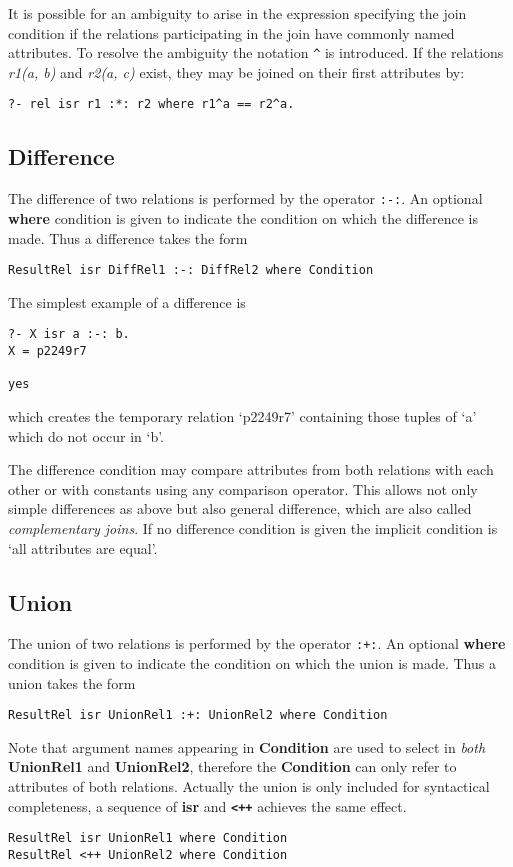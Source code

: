 It is possible for an ambiguity to arise in the  expression
specifying the join condition if the relations participating in the
join have commonly named attributes.
To resolve the ambiguity the notation \verb-^- is introduced. 
If the relations {\em r1(a, b)} and {\em r2(a, c)} exist, they may be 
joined on their first attributes by:
\begin{verbatim}
?- rel isr r1 :*: r2 where r1^a == r2^a.
\end{verbatim}

\subsection{Difference}
 \index{$:-:$}
The difference of two relations is performed by the operator \verb+:-:+. 
An optional {\bf where} condition is given to indicate the condition on which
the difference is made. Thus a difference takes the form
\begin{verbatim}
ResultRel isr DiffRel1 :-: DiffRel2 where Condition
\end{verbatim}
The simplest example of a difference is
\begin{verbatim}
?- X isr a :-: b.
X = p2249r7

yes
\end{verbatim}
which creates the temporary relation `p2249r7' containing those
tuples of `a' which do not occur in `b'.

The difference condition may compare attributes from both relations
with each other or with constants using any comparison operator.
This allows not only simple differences as above but also general
difference, which are also called {\em complementary joins}.
If no difference condition is given the implicit condition is `all
attributes are equal'.

\subsection{Union}
 \index{$:+:$}
The union of two relations is performed by the operator \verb-:+:-.
An optional {\bf where} condition is given to indicate the condition on which
the union is made. Thus a union takes the form
\begin{verbatim}
ResultRel isr UnionRel1 :+: UnionRel2 where Condition
\end{verbatim}

Note that argument names appearing in {\bf Condition} are used to select
in {\em both} {\bf UnionRel1} and {\bf UnionRel2}, therefore the
{\bf Condition} can only refer to attributes of both relations.
Actually the union is only included for syntactical completeness, a sequence
of {\bf isr} and {\bf \verb-<++-} achieves the same effect.
\begin{verbatim}
ResultRel isr UnionRel1 where Condition
ResultRel <++ UnionRel2 where Condition
\end{verbatim}



